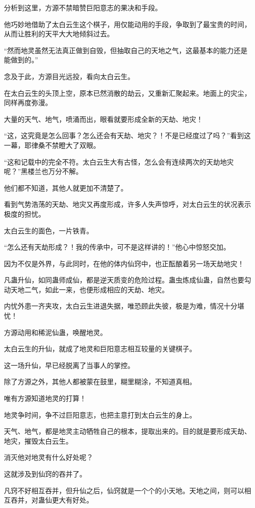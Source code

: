 \begin{this_body}
分析到这里，方源不禁暗赞巨阳意志的果决和手段。

他巧妙地借助了太白云生这个棋子，用仅能动用的手段，争取到了最宝贵的时间，从而让胜利的天平大大地倾斜过去。

“然而地灵虽然无法真正做到自毁，但抽取自己的天地之气，这最基本的能力还是能做到的。”

念及于此，方源目光远投，看向太白云生。

在太白云生的头顶上空，原本已然消散的劫云，又重新汇聚起来。地面上的灾尘，同样再度弥漫。

大量的天气、地气，喷涌而出，眼看就要形成全新的天劫、地灾！

“这，这究竟是怎么回事？怎么还会有天劫、地灾？！不是已经度过了吗？”看到这一幕，耶律桑不禁瞪大了双眼。

“这和记载中的完全不符。太白云生大有古怪，怎么会有连续两次的天劫地灾呢？”黑楼兰也万分不解。

他们都不知道，其他人就更加不清楚了。

看到气势浩荡的天劫、地灾又再度形成，许多人失声惊呼，对太白云生的状况表示极度的担忧。

太白云生的面色，一片铁青。

“怎么还有天劫形成？！我的传承中，可不是这样讲的！”他心中惊怒交加。

因为不仅是外界，与此同时，在他的体内仙窍中，也正酝酿着另一场天劫地灾！

凡蛊升仙，如同蛊师成仙，都是逆天质变的危险过程。蛊虫炼成仙蛊，自然也要勾动天地二气，如此一来，也便形成相应的天劫、地灾。

内忧外患一齐夹攻，太白云生进退失据，唯恐顾此失彼，极是为难，情况十分堪忧！

方源动用和稀泥仙蛊，唤醒地灵。

太白云生的升仙，就成了地灵和巨阳意志相互较量的关键棋子。

这一场升仙，早已经脱离了当事人的掌控。

除了方源之外，其他人都被蒙在鼓里，糊里糊涂，不知道真相。

唯有方源知道地灵的打算！

地灵争时间，争不过巨阳意志，也把主意打到太白云生的身上。

天气、地气，都是地灵主动牺牲自己的根本，提取出来的。目的就是要形成天劫、地灾，摧毁太白云生。

消灭他对地灵有什么好处呢？

这就涉及到仙窍的吞并了。

凡窍不好相互吞并，但升仙之后，仙窍就是一个个的小天地。天地之间，则可以相互吞并，对蛊仙更大有好处。


\end{this_body}
